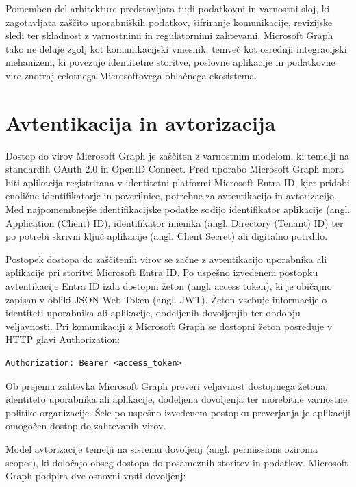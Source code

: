 \documentclass[a4paper, 12pt]{book}
\begin{document}
Pomemben del arhitekture predstavljata tudi podatkovni in varnostni sloj, ki zagotavljata zaščito uporabniških podatkov, šifriranje komunikacije, revizijske sledi ter skladnost z varnostnimi in regulatornimi zahtevami.
Microsoft Graph tako ne deluje zgolj kot komunikacijski vmesnik, temveč kot osrednji integracijski mehanizem, ki povezuje identitetne storitve, poslovne aplikacije in podatkovne vire znotraj celotnega Microsoftovega oblačnega ekosistema.


\section{Avtentikacija in avtorizacija}

Dostop do virov Microsoft Graph je zaščiten z varnostnim modelom, ki temelji na standardih OAuth 2.0 in OpenID Connect.
Pred uporabo Microsoft Graph mora biti aplikacija registrirana v identitetni platformi Microsoft Entra ID, kjer pridobi enolične identifikatorje in poverilnice, potrebne za avtentikacijo in avtorizacijo. Med najpomembnejše identifikacijske podatke sodijo identifikator aplikacije (angl. Application (Client) ID), identifikator imenika (angl. Directory (Tenant) ID) ter po potrebi skrivni ključ aplikacije (angl. Client Secret) ali digitalno potrdilo.

Postopek dostopa do zaščitenih virov se začne z avtentikacijo uporabnika ali aplikacije pri storitvi Microsoft Entra ID.
Po uspešno izvedenem postopku avtentikacije Entra ID izda dostopni žeton (angl. access token), ki je običajno zapisan v obliki JSON Web Token (angl. JWT).
Žeton vsebuje informacije o identiteti uporabnika ali aplikacije, dodeljenih dovoljenjih ter obdobju veljavnosti.
Pri komunikaciji z Microsoft Graph se dostopni žeton posreduje v HTTP glavi Authorization:

\begin{verbatim}
Authorization: Bearer <access_token>
\end{verbatim}

Ob prejemu zahtevka Microsoft Graph preveri veljavnost dostopnega žetona, identiteto uporabnika ali aplikacije, dodeljena dovoljenja ter morebitne varnostne politike organizacije.
Šele po uspešno izvedenem postopku preverjanja je aplikaciji omogočen dostop do zahtevanih virov.

Model avtorizacije temelji na sistemu dovoljenj (angl. permissions oziroma scopes), ki določajo obseg dostopa do posameznih storitev in podatkov. Microsoft Graph podpira dve osnovni vrsti dovoljenj:
\end{document}
